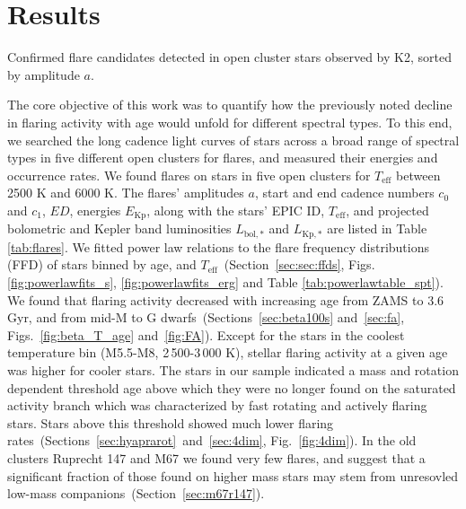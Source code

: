 \documentclass{aa}
\begin{document}
\section{Results}
\label{sec:results}
\begin{table}
\caption{Confirmed flare candidates detected in open cluster stars observed by K2, sorted by amplitude $a$.}
\label{tab:flares}
\centering
\footnotesize

\end{table}


The core objective of this work was to quantify how the previously noted decline in flaring activity with age would unfold for different spectral types. To this end, we searched the long cadence light curves of stars across a broad range of spectral types in five different open clusters for flares, and measured their energies and occurrence rates. We found \unskip\;flares on \unskip\;stars in five open clusters for $T_\mathrm{eff}$ between 2500 K and 6000 K. The flares' amplitudes $a$, start and end cadence numbers $c_0$ and $c_1$, $ED$, energies $E_\mathrm{Kp}$, along with the stars' EPIC ID, $T_\mathrm{eff}$, and projected bolometric and Kepler band luminosities $L_\mathrm{bol,*}$ and $L_\mathrm{Kp,*}$ are listed in Table \ref{tab:flares}. We fitted power law relations to the flare frequency distributions (FFD) of stars binned by age, and $T_\mathrm{eff}$~(Section~\ref{sec:sec:ffds}, Figs. \ref{fig:powerlawfits_s}, \ref{fig:powerlawfits_erg} and Table \ref{tab:powerlawtable_spt}). We found that flaring activity decreased with increasing age from ZAMS to 3.6 Gyr, and from mid-M to G dwarfs~(Sections~\ref{sec:beta100s} and~\ref{sec:fa}, Figs.~\ref{fig:beta_T_age} and~\ref{fig:FA}). Except for the stars in the coolest temperature bin (M5.5-M8, 2\,500-3\,000 K), stellar flaring activity at a given age was higher for cooler stars. The stars in our sample indicated a mass and rotation dependent threshold age above which they were no longer found on the saturated activity branch which was characterized by fast rotating and actively flaring stars. Stars above this threshold showed much lower flaring rates~(Sections~\ref{sec:hyaprarot}~and~\ref{sec:4dim}, Fig.~\ref{fig:4dim}). In the old clusters Ruprecht 147 and M67 we found very few flares, and suggest that a significant fraction of those found on higher mass stars may stem from unresovled low-mass companions~(Section~\ref{sec:m67r147}). 
\end{document}
